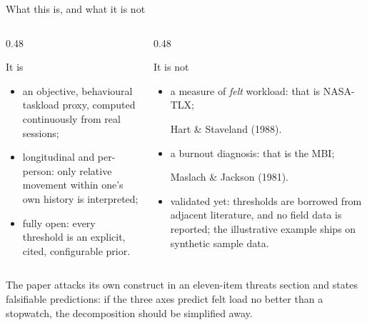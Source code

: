 \documentclass[aspectratio=169,10pt]{beamer}
\newcommand{\good}[1]{\textcolor{Sage}{#1}}
\newcommand{\badc}[1]{\textcolor{Rust}{#1}}
\newcommand{\src}[1]{{\scriptsize\color{InkFaint}#1\par}}
\begin{document}
\begin{frame}{What this is, and what it is not}
  \begin{columns}[T]
    \begin{column}{0.48\textwidth}
      {\small\good{It is}\par}
      \begin{itemize}
        \item an objective, behavioural \good{taskload proxy}, computed
              continuously from real sessions;
        \item longitudinal and per-person: only relative movement within
              one's own history is interpreted;
        \item fully open: every threshold is an explicit, cited,
              configurable prior.
      \end{itemize}
    \end{column}
    \begin{column}{0.48\textwidth}
      {\small\badc{It is not}\par}
      \begin{itemize}
        \item a measure of \emph{felt} workload: that is NASA-TLX;
              \src{Hart \& Staveland (1988).}
        \item a burnout diagnosis: that is the MBI;
              \src{Maslach \& Jackson (1981).}
        \item validated yet: thresholds are borrowed from adjacent
              literature, and no field data is reported; the illustrative
              example ships on synthetic sample data.
      \end{itemize}
    \end{column}
  \end{columns}
  \vspace{2mm}
  {\small The paper attacks its own construct in an eleven-item threats
   section and states \good{falsifiable predictions}: if the three axes
   predict felt load no better than a stopwatch, the decomposition should be
   simplified away.\par}
\end{frame}
\end{document}
